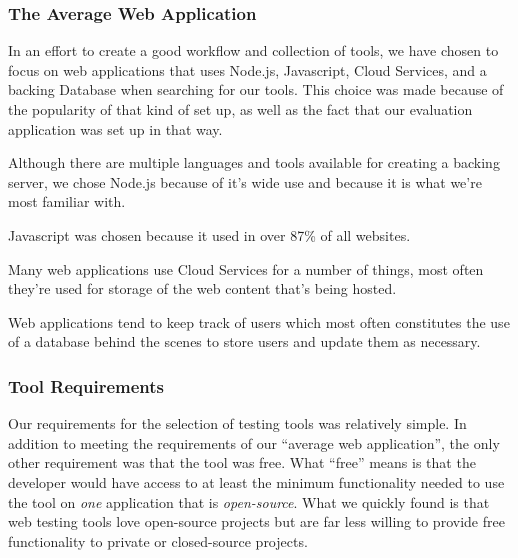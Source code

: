 \documentclass[11pt]{article}
\begin{document}

\subsubsection{The Average Web Application}
In an effort to create a good workflow and collection of tools, we have chosen to focus on web applications that uses Node.js, Javascript, Cloud Services, and a backing Database when searching for our tools. This choice was made because of the popularity of that kind of set up, as well as the fact that our evaluation application was set up in that way.

Although there are multiple languages and tools available for creating a backing server, we chose Node.js because of it's wide use and because it is what we're most familiar with.

Javascript was chosen because it used in over 87\% of all websites. \cite{JSUsage} 

Many web applications use Cloud Services for a number of things, most often they're used for storage of the web content that's being hosted.

Web applications tend to keep track of users which most often constitutes the use of a database behind the scenes to store users and update them as necessary.


\subsubsection{Tool Requirements}
Our requirements for the selection of testing tools was relatively simple. In addition to meeting the requirements of our ``average web application'', the only other requirement was that the tool was free. What ``free'' means is that the developer would have access to at least the minimum functionality needed to use the tool on \emph{one} application that is \emph{open-source}. What we quickly found is that web testing tools love open-source projects but are far less willing to provide free functionality to private or closed-source projects. 
\end{document}

